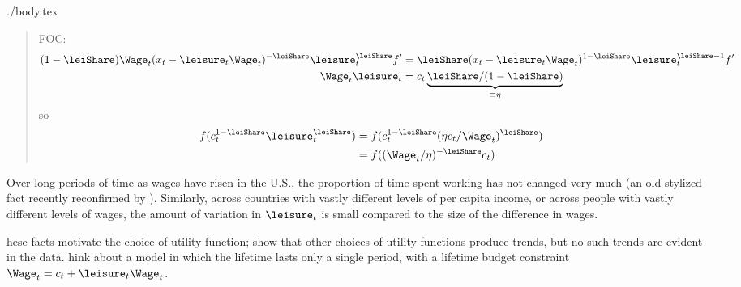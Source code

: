 \documentclass{handout}
\begin{document}
\begin{verbatimwrite}{./body.tex}
{\begin{quote}
FOC:
\begin{equation}\begin{gathered}\begin{aligned}
  \label{eq:23}
  (1-\leiShare) \Wage_{t}(x_{t}-\leisure_{t}\Wage_{t})^{-\leiShare}\leisure_{t}^{\leiShare}{f}^{\prime} & =  \leiShare (x_{t}-\leisure_{t}\Wage_{t})^{1-\leiShare}\leisure_{t}^{\leiShare-1}{f}^{\prime}
\\ \Wage_{t} \leisure_{t} & =  c_{t} \underbrace{\leiShare/(1-\leiShare)}_{\equiv \eta}
\end{aligned}\end{gathered}\end{equation}
so
\begin{equation}\begin{gathered}\begin{aligned}
  \label{eq:5}
  {f}(c_{t}^{1-\leiShare}\leisure_{t}^{\leiShare}) & =  {f}(c_{t}^{1-\leiShare}(\eta c_{t}/\Wage_{t})^{\leiShare})
\\ & =  {f}((\Wage_{t}/\eta)^{-\leiShare}c_{t})
\end{aligned}\end{gathered}\end{equation}
\end{quote}}






Over long periods of time as wages have risen in the U.S., the proportion
of time spent working has not changed very much (an old stylized fact recently reconfirmed by \cite{rameyFrancisLeisure}).  Similarly, across 
countries with vastly different levels of per capita income, or across
people with vastly different levels of wages, the amount of 
variation in $\leisure_{t}$ is small compared to the size of the difference
in wages.  

hese facts motivate the choice 
of utility function; \cite{kpr:prodn} show that other choices of utility
functions produce trends, but no such trends are evident in the data.  
hink about a model in which
the lifetime lasts only a single period, with a lifetime budget constraint $\Wage_{t}  =  c_{t}+\leisure_{t}\Wage_{t}$.



\end{verbatimwrite}
\end{document}
